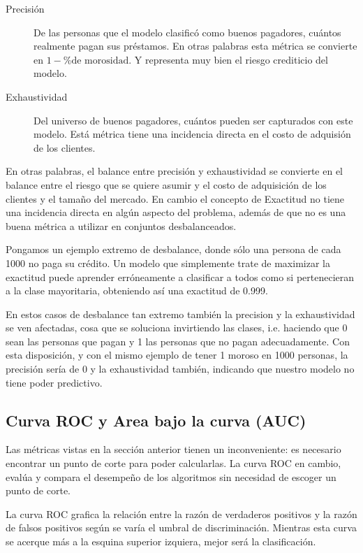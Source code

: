 \begin{description}
    \item [Precisión] De las personas que el modelo clasificó como buenos pagadores, cuántos realmente pagan sus préstamos. En otras palabras esta métrica se convierte en $1 - \text{\% de morosidad}$. Y representa muy bien el riesgo crediticio del modelo.
    \item [Exhaustividad] Del universo de buenos pagadores, cuántos pueden ser capturados con este modelo. Está métrica tiene una incidencia directa en el costo de adquisión de los clientes.
\end{description}

En otras palabras, el balance entre precisión y exhaustividad se convierte en el balance entre el riesgo que se quiere asumir y el costo de adquisición de los clientes y el tamaño del mercado. En cambio el concepto de Exactitud no tiene una incidencia directa en algún aspecto del problema, además de que no es una buena métrica a utilizar en conjuntos desbalanceados.

Pongamos un ejemplo extremo de desbalance, donde sólo una persona de cada 1000 no paga su crédito. Un modelo que simplemente trate de maximizar la exactitud puede aprender erróneamente a clasificar a todos como si pertenecieran a la clase mayoritaria, obteniendo así una exactitud de 0.999.

En estos casos de desbalance tan extremo también la precision y la exhaustividad se ven afectadas, cosa que se soluciona invirtiendo las clases, i.e. haciendo que 0 sean las personas que pagan y 1 las personas que no pagan adecuadamente. Con esta disposición, y con el mismo ejemplo de tener 1 moroso en 1000 personas, la precisión sería de 0 y la exhaustividad también, indicando que nuestro modelo no tiene poder predictivo.

\subsection{Curva ROC y Area bajo la curva (AUC)}

Las métricas vistas en la sección anterior tienen un inconveniente: es necesario encontrar un punto de corte para poder calcularlas. La curva ROC en cambio, evalúa y compara el desempeño de los algoritmos sin necesidad de escoger un punto de corte.

La curva ROC grafica la relación entre la razón de verdaderos positivos y la razón de falsos positivos según se varía el umbral de discriminación. Mientras esta curva se acerque más a la esquina superior izquiera, mejor será la clasificación.

